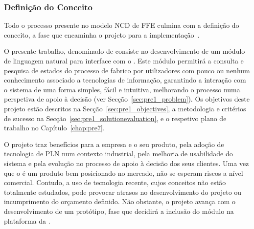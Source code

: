 \subsubsection*{Definição do Conceito}

Todo o processo presente no modelo \gls{NCD} de \gls{FFE} culmina com a definição do conceito, a fase que encaminha o projeto para a implementação~\parencite{ffe_effectivemethods_tools_techniques}.

O presente trabalho, denominado de  consiste no desenvolvimento de um módulo de linguagem natural para interface com o {\productname}. Este módulo permitirá a consulta e pesquisa de estados do processo de fabrico por utilizadores com pouco ou nenhum conhecimento associado a tecnologias de informação, garantindo a interação com o sistema de uma forma simples, fácil e intuitiva, melhorando o processo numa perspetiva de apoio à decisão (ver Secção~\ref{sec:pre1_problem}). Os objetivos deste projeto estão descritos na Secção~\ref{sec:pre1_objectives}, a metodologia e critérios de sucesso na Secção~\ref{sec:pre1_solutionevaluation}, e o respetivo plano de trabalho no Capítulo~\ref{chap:pre7}.

O projeto traz benefícios para a empresa e o seu produto, pela adoção de tecnologia de \gls{PLN} num contexto industrial, pela melhoria de usabilidade do sistema e pela evolução no processo de apoio à decisão dos seus clientes. Uma vez que o {\productname} é um produto bem posicionado no mercado, não se esperam riscos a nível comercial. Contudo, a uso de tecnologia recente, cujos conceitos não estão totalmente estudados, pode provocar atrasos no desenvolvimento do projeto ou incumprimento do orçamento definido. Não obstante, o projeto avança com o desenvolvimento de um protótipo, fase que decidirá a inclusão do módulo na plataforma da {\companyname}.